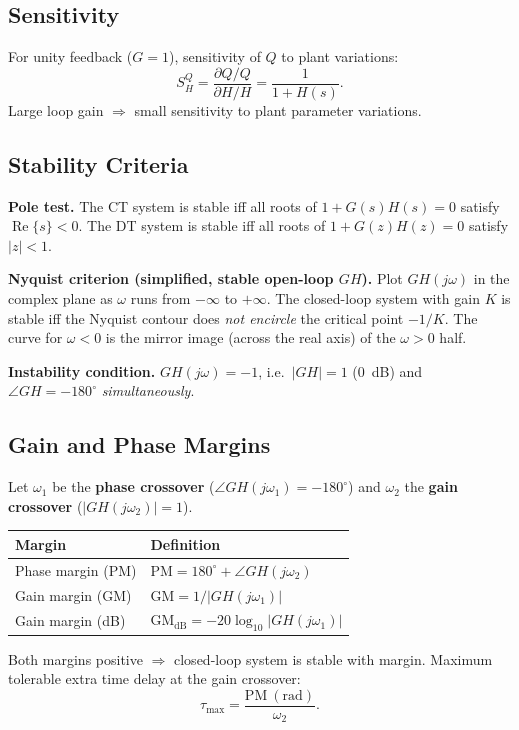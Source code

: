 \documentclass[10pt]{article}
\newcommand{\Real}{\operatorname{Re}}
\begin{document}
\subsection{Sensitivity}
For unity feedback ($G=1$), sensitivity of $Q$ to plant variations:
\[
S_H^Q = \frac{\partial Q/Q}{\partial H/H} = \frac{1}{1 + H(s)}.
\]
Large loop gain $\Rightarrow$ small sensitivity to plant parameter variations.

\subsection{Stability Criteria}
\textbf{Pole test.} The CT system is stable iff all roots of
$1 + G(s)H(s) = 0$ satisfy $\Real\{s\}<0$. The DT system is stable iff all
roots of $1 + G(z)H(z) = 0$ satisfy $|z|<1$.

\textbf{Nyquist criterion (simplified, stable open-loop $GH$).} Plot
$GH(j\omega)$ in the complex plane as $\omega$ runs from $-\infty$ to
$+\infty$. The closed-loop system with gain $K$ is stable iff the Nyquist
contour does \emph{not encircle} the critical point $-1/K$. The curve for
$\omega<0$ is the mirror image (across the real axis) of the $\omega>0$ half.

\textbf{Instability condition.} $GH(j\omega)=-1$, i.e.\ $|GH|=1$ (0~dB) and
$\angle GH = -180^\circ$ \emph{simultaneously}.

\subsection{Gain and Phase Margins}
Let $\omega_1$ be the \textbf{phase crossover} ($\angle GH(j\omega_1) = -180^\circ$)
and $\omega_2$ the \textbf{gain crossover} ($|GH(j\omega_2)| = 1$).
\begin{center}
\begin{tabular}{@{}ll@{}}
\toprule
Margin & Definition \\
\midrule
Phase margin (PM) & $\mathrm{PM} = 180^\circ + \angle GH(j\omega_2)$ \\
Gain margin (GM) & $\mathrm{GM} = 1/|GH(j\omega_1)|$ \\
Gain margin (dB) & $\mathrm{GM}_{\mathrm{dB}} = -20\log_{10}|GH(j\omega_1)|$ \\
\bottomrule
\end{tabular}
\end{center}
Both margins positive $\Rightarrow$ closed-loop system is stable with margin.
Maximum tolerable extra time delay at the gain crossover:
\[
\tau_{\max} = \frac{\mathrm{PM}\ (\text{rad})}{\omega_2}.
\]
\end{document}
